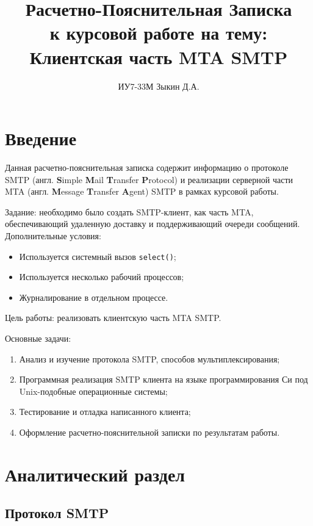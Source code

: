 \documentclass[a4paper,12pt]{report}
\title{Расчетно-Пояснительная Записка \\ 
    \large к курсовой работе на тему: \\ Клиентская часть MTA SMTP}
\author{ИУ7-33М Зыкин Д.А.}
\begin{document}
\maketitle


\tableofcontents

\clearpage
\chapter*{Введение}

Данная расчетно-пояснительная записка содержит информацию о протоколе SMTP (англ. \textbf{S}imple \textbf{M}ail \textbf{T}ransfer \textbf{P}rotocol) и реализации серверной части MTA (англ. \textbf{M}essage \textbf{T}ransfer \textbf{A}gent) SMTP в рамках курсовой работы.

Задание: необходимо было создать SMTP-клиент, как часть MTA, обеспечивающий удаленную доставку и поддерживающий очереди сообщений. Дополнительные условия:
\begin{itemize}
\item Используется системный вызов \texttt{select()};
\item Используется несколько рабочий процессов;
\item Журналирование в отдельном процессе.
\end{itemize}

Цель работы: реализовать клиентскую часть MTA SMTP.

Основные задачи:
\begin{enumerate}
    \item Анализ и изучение протокола SMTP, способов мультиплексирования;
    \item Программная реализация SMTP клиента на языке программирования Си под Unix-подобные операционные системы;
    \item Тестирование и отладка написанного клиента;
    \item Оформление расчетно-пояснительной записки по результатам работы.
\end{enumerate}


\chapter{Аналитический раздел}


\section{Протокол SMTP}
\end{document}
